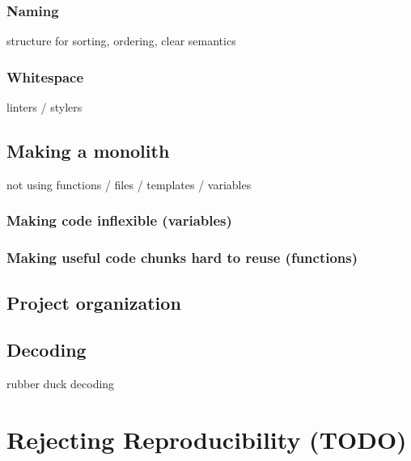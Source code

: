 \documentclass[
]{krantz}
\begin{document}
\hypertarget{naming}{%
\subsection{Naming}\label{naming}}

structure for sorting, ordering, clear semantics

\hypertarget{whitespace}{%
\subsection{Whitespace}\label{whitespace}}

linters / stylers

\hypertarget{making-a-monolith}{%
\section{Making a monolith}\label{making-a-monolith}}

not using functions / files / templates / variables

\hypertarget{making-code-inflexible-variables}{%
\subsection{Making code inflexible (variables)}\label{making-code-inflexible-variables}}

\hypertarget{making-useful-code-chunks-hard-to-reuse-functions}{%
\subsection{Making useful code chunks hard to reuse (functions)}\label{making-useful-code-chunks-hard-to-reuse-functions}}

\hypertarget{project-organization}{%
\section{Project organization}\label{project-organization}}

\hypertarget{decoding}{%
\section{Decoding}\label{decoding}}

rubber duck decoding

\hypertarget{reje-repr}{%
\chapter{Rejecting Reproducibility (TODO)}\label{reje-repr}}
\end{document}
